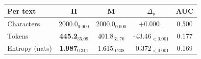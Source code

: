 \begin{tabular}{lcccc}
\toprule
\textbf{Per text} & \textbf{H} & \textbf{M} & \textbf{$\Delta_p$} & \textbf{AUC} \\
\midrule
Characters & 2000.0$_{0.000}$ & 2000.0$_{0.000}$ & +0.000$_{-}$ & 0.500 \\
Tokens & \textbf{445.2}$_{35.09}$ & 401.8$_{31.70}$ & -43.46$_{<0.001}$ & 0.177 \\
Entropy (nats) & \textbf{1.987}$_{0.311}$ & 1.615$_{0.238}$ & -0.372$_{<0.001}$ & 0.169 \\
\bottomrule
\end{tabular}
